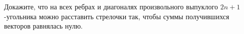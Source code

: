 Докажите, что на всех ребрах и диагоналях произвольного выпуклого $2n + 1$-угольника можно расставить
стрелочки так, чтобы суммы получившихся векторов равнялась нулю.
